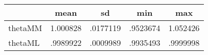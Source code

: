 {
\def\sym#1{\ifmmode^{#1}\else\(^{#1}\)\fi}
\begin{tabular}{l*{1}{cccc}}
\toprule
                    &        mean&          sd&         min&         max\\
\midrule
thetaMM             &    1.000828&    .0177119&    .9523674&    1.052426\\
thetaML             &    .9989922&    .0009989&    .9935493&    .9999998\\
\bottomrule
\end{tabular}
}
